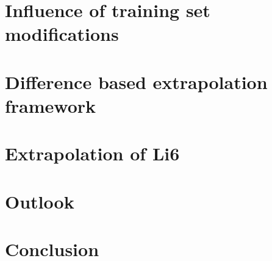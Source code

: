 \chapter{Influence of training set modifications}
\label{chap:extended}


\chapter{Difference based extrapolation framework}
\label{chap:diff}


\chapter{Extrapolation of Li6}
\label{chap:li6}


\chapter{Outlook}
\label{chap:outlook}


\chapter{Conclusion}
\label{chap:conclusion}



\printbibliography

